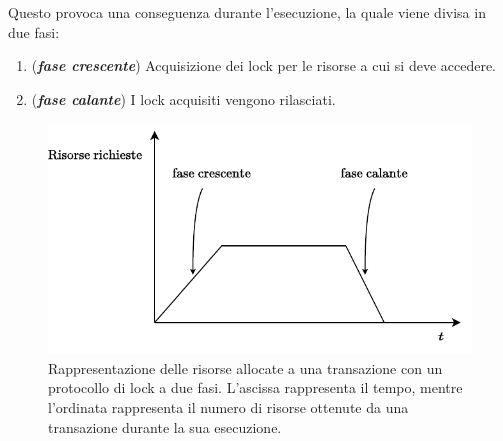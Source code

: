 \documentclass[a4paper]{article}
\begin{document}
	Questo provoca una conseguenza durante l'esecuzione, la quale viene divisa in due fasi:
	\begin{enumerate}
		\item (\textbf{\emph{fase crescente}}) Acquisizione dei lock per le risorse a cui si deve accedere.
		
		\item (\textbf{\emph{fase calante}}) I lock acquisiti vengono rilasciati.
	\end{enumerate}\newpage

	\begin{figure}[!htp]
		\centering
		\includegraphics[width=.9\textwidth]{img/conseguenza_2PL.pdf}
		\caption{Rappresentazione delle risorse allocate a una transazione con un protocollo di lock a due fasi. L'ascissa rappresenta il tempo, mentre l'ordinata rappresenta il numero di risorse ottenute da una transazione durante la sua esecuzione.}
	\end{figure}
	
\end{document}
